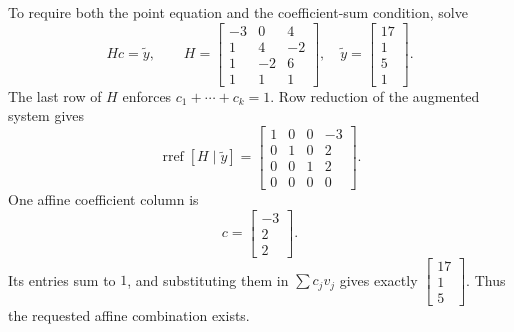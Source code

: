 To require both the point equation and the coefficient-sum condition, solve
\[Hc=\widetilde y,\qquad H=\begin{bmatrix}-3&0&4\\1&4&-2\\1&-2&6\\1&1&1\end{bmatrix},\quad\widetilde y=\begin{bmatrix}17\\1\\5\\1\end{bmatrix}.\]
The last row of $H$ enforces $c_1+\cdots+c_k=1$. Row reduction of the augmented system gives
\[\operatorname{rref}[H\mid\widetilde y]=\begin{bmatrix}1&0&0&-3\\0&1&0&2\\0&0&1&2\\0&0&0&0\end{bmatrix}.\]
One affine coefficient column is
\[c=\begin{bmatrix}-3\\2\\2\end{bmatrix}.\]
Its entries sum to $1$, and substituting them in $\sum c_jv_j$ gives exactly $\begin{bmatrix}17\\1\\5\end{bmatrix}$. Thus the requested affine combination exists.

